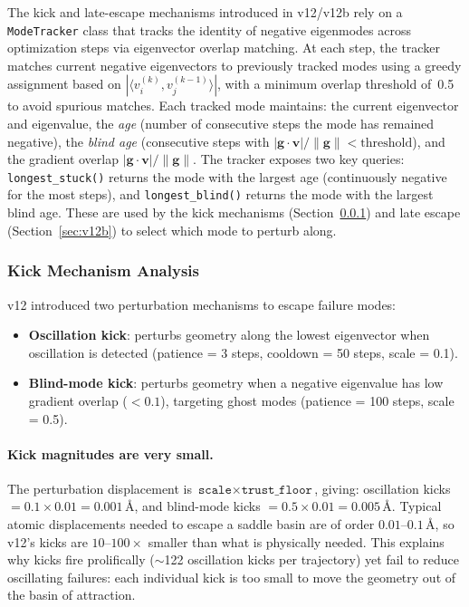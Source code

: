 \documentclass[11pt,a4paper]{article}
\theoremstyle{definition}
\begin{document}
The kick and late-escape mechanisms introduced in v12/v12b rely on a
\texttt{ModeTracker} class that tracks the identity of negative
eigenmodes across optimization steps via eigenvector overlap matching.
At each step, the tracker matches current negative eigenvectors to
previously tracked modes using a greedy assignment based on
$|\langle v_i^{(k)}, v_j^{(k-1)}\rangle|$, with a minimum overlap
threshold of~0.5 to avoid spurious matches.  Each tracked mode
maintains: the current eigenvector and eigenvalue, the \emph{age}
(number of consecutive steps the mode has remained negative), the
\emph{blind age} (consecutive steps with
$|\mathbf{g} \cdot \mathbf{v}| / \|\mathbf{g}\| < \text{threshold}$),
and the gradient overlap $|\mathbf{g} \cdot \mathbf{v}| / \|\mathbf{g}\|$.
The tracker exposes two key queries:
\texttt{longest\_stuck()} returns the mode with the largest age
(continuously negative for the most steps), and
\texttt{longest\_blind()} returns the mode with the largest blind age.
These are used by the kick mechanisms (Section~\ref{sec:v12-kicks}) and
late escape (Section~\ref{sec:v12b}) to select which mode to perturb
along.

\subsubsection{Kick Mechanism Analysis}
\label{sec:v12-kicks}

v12 introduced two perturbation mechanisms to escape failure modes:
\begin{itemize}[nosep]
  \item \textbf{Oscillation kick}: perturbs geometry along the lowest
    eigenvector when oscillation is detected (patience = 3 steps,
    cooldown = 50 steps, scale = 0.1).
  \item \textbf{Blind-mode kick}: perturbs geometry when a negative
    eigenvalue has low gradient overlap ($<0.1$), targeting ghost modes
    (patience = 100 steps, scale = 0.5).
\end{itemize}

\paragraph{Kick magnitudes are very small.}
The perturbation displacement is $\texttt{scale} \times \texttt{trust\_floor}$,
giving: oscillation kicks $= 0.1 \times 0.01 = 0.001$\,\AA, and
blind-mode kicks $= 0.5 \times 0.01 = 0.005$\,\AA.  Typical atomic
displacements needed to escape a saddle basin are of order
$0.01$--$0.1$\,\AA, so v12's kicks are $10$--$100\times$ smaller than
what is physically needed.  This explains why kicks fire prolifically
($\sim$122 oscillation kicks per trajectory) yet fail to reduce oscillating
failures: each individual kick is too small to move the geometry out of
the basin of attraction.
\end{document}
